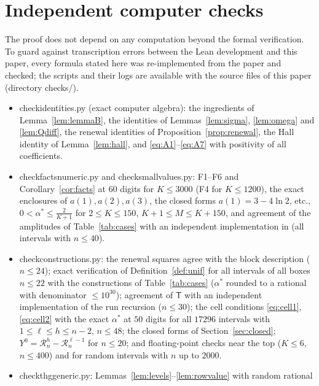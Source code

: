 \documentclass[11pt]{amsart}
\theoremstyle{definition}
\theoremstyle{remark}
\numberwithin{equation}{section}
\newcommand{\sT}{\mathsf{T}}
\newcommand{\cR}{\mathcal{R}}
\newcommand{\leanus}{\textunderscore\allowbreak}
\newcommand{\lean}[1]{{\ttfamily\let\_\leanus #1}}
\begin{document}
\section{Independent computer checks}\label{app:checks}

The proof does not depend on any computation beyond the formal verification. To guard against
transcription errors between the Lean development and this paper, every formula stated here was
re-implemented from the paper and checked; the scripts and their logs are available with the source
files of this paper (directory \lean{checks/}).
\begin{itemize}
\item \lean{check\_identities.py} (exact computer algebra): the ingredients of Lemma~\ref{lem:lemmaB},
the identities of Lemmas~\ref{lem:sigma}, \ref{lem:omega} and \ref{lem:Qdiff}, the renewal identities of
Proposition~\ref{prop:renewal}, the Hall identity of Lemma~\ref{lem:hall}, and
\eqref{eq:A1}--\eqref{eq:A7} with positivity of all coefficients.
\item \lean{check\_facts\_numeric.py} and \lean{check\_small\_values.py}: F1--F6 and
Corollary~\ref{cor:facts} at $60$ digits for $K\le3000$ (F4 for $K\le1200$), the exact enclosures of
$a(1),a(2),a(3)$, the closed forms $a(1)=3-4\ln2$, etc., $0<\alpha^*\le\frac2{K+1}$ for
$2\le K\le150$, $K+1\le M\le K+150$, and agreement of the amplitudes of Table~\ref{tab:cases} with an
independent implementation in \cite{STUrepo} (all intervals with $n\le40$).
\item \lean{check\_constructions.py}: the renewal squares agree with the block description ($n\le24$);
exact verification of Definition~\ref{def:unif} for all intervals of all boxes $n\le22$ with the
constructions of Table~\ref{tab:cases} ($\alpha^*$ rounded to a rational with denominator
$\le10^{30}$); agreement of $\sT$ with an independent implementation of the run recursion ($n\le30$); the
cell conditions \eqref{eq:cell1}, \eqref{eq:cell2} with the exact $\alpha^*$ at $50$ digits for all
$17296$ intervals with $1\le\ell\le h\le n-2$, $n\le48$; the closed forms of Section~\ref{sec:closed};
$Y^0=\cR^h_n-\cR^{\ell-1}_n$ for $n\le20$; and floating-point checks near the top ($K\le6$, $n\le400$)
and for random intervals with $n$ up to $2000$.
\item \lean{check\_thg\_generic.py}: Lemmas~\ref{lem:levels}--\ref{lem:rowvalue} with random rational

\end{itemize}
\end{document}

